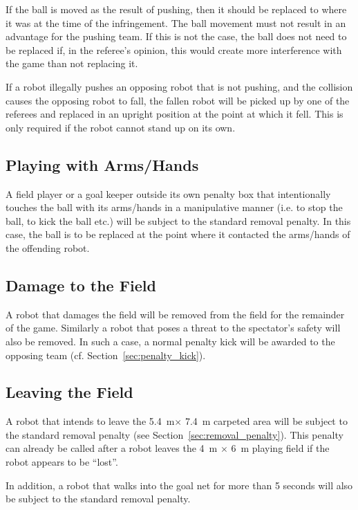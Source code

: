 \documentclass[12pt]{article}
\newcommand{\cf}{\mbox{cf.}\xspace}
\newcommand{\TotalWidth}{5.4~m\xspace}
\newcommand{\TotalLength}{7.4~m\xspace }
\begin{document}
If the ball is moved as the result of pushing, then it should be replaced to where it was at the time of the infringement.
The ball movement must not result in an advantage for the pushing team.
If this is not the case, the ball does not need to be replaced if, in the referee's opinion, this would create more interference with the game than not replacing it.

If a robot illegally pushes an opposing robot that is not pushing, and the collision causes the opposing robot to fall, the fallen robot will be picked up by one of the referees and replaced in an upright position at the point at which it fell. This is only required if the robot cannot stand up on its own.

\subsection{Playing with Arms/Hands}
\label{sec:hand_ball}

A field player or a goal keeper outside its own penalty box that intentionally touches the ball with its arms/hands in a manipulative manner (i.e. to stop the ball, to kick the ball etc.) will be subject to the standard removal penalty. In this case, the ball is to be replaced at the point where it contacted the arms/hands of the offending robot.

\subsection{Damage to the Field}

A robot that damages the field will be removed from the field for the remainder of the game. Similarly a robot that poses a threat to the spectator's safety will also be removed. In such a case, a normal penalty kick will be awarded to the opposing team (\cf Section~\ref{sec:penalty_kick}).

\subsection{Leaving the Field}
\label{sec:leaving_field}

A robot that intends to leave the \TotalWidth $\times$ \TotalLength carpeted area will be subject to the standard removal penalty (see
Section~\ref{sec:removal_penalty}). This penalty can already be called after a robot leaves the 4~m $\times$ 6~m playing field if the robot appears to be ``lost''.

In addition, a robot that walks into the goal net for more than 5 seconds will also be subject to the standard removal penalty.
\end{document}
